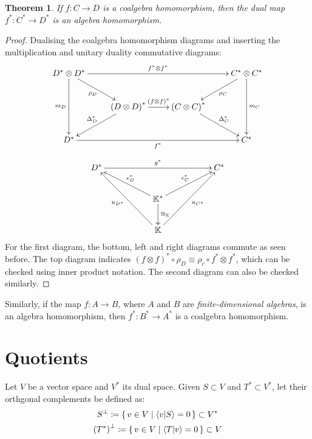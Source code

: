\documentclass[svgnames]{article}
\newtheorem{Theorem}{Theorem}
\theoremstyle{definition}
\theoremstyle{remark}
\theoremstyle{underline}
\theoremstyle{underline}
\begin{document}
	\begin{Theorem}
		If $f\colon C \to D$ is a coalgebra homomorphism, then the dual map $f^*\colon C^* \to D^*$ is an algebra homomorphism.
	\end{Theorem}
	\begin{proof}
		Dualising the coalgebra homomorphism diagrams and inserting the multiplication and unitary duality commutative diagrams:
		\begin{align*}
		\xymatrix{
			D^* \otimes D^* \ar[dd]_-{m_D} \ar[rd]_-{\rho_D} \ar[rrr]^-{f^* \otimes f^*} & & & C^* \otimes C^* \ar[ld]^-{\rho_C} \ar[dd]^-{m_C} \\
			& \pqty{D \otimes D}^* \ar[r]^-{\pqty{f \otimes f}^*} \ar[ld]_-{\Delta^*_D} & \pqty{C \otimes C}^* \ar[rd]^-{\Delta^*_C} & \\
			D^* \ar[rrr]_-{f^*} & & & C^*
		}
		\end{align*}
		\begin{align*}
			\xymatrix{
			D^* \ar[rrrr]^-{g^*} & & & & C^*  \\
			& & \mathbb K^* \ar[llu]_-{\epsilon^*_D} \ar[d]^-{\cong_{\mathbb K}} \ar[rru]^-{\epsilon^*_C} & & \\
			& & \mathbb K \ar[lluu]^-{u_{D^*}} \ar[rruu]_-{u_{C^*}} & & 
		}
		\end{align*}
		For the first diagram, the bottom, left and right diagrams commute as seen before. The top diagram indicates $(f \otimes f)^* \circ \rho_D \equiv \rho_c \circ f^* \otimes f^*$, which can be checked using inner product notation. The second diagram can also be checked similarly.
	\end{proof}
	Similarly, if the map $f\colon A \to B$, where $A$ and $B$ are \emph{finite-dimensional algebras}, is an algebra homomorphism, then $f^* \colon B^* \to A^*$ is a coalgebra homomorphism. 

	\section{Quotients}

	Let $V$ be a vector space and $V^*$ its dual space. Given $S \subset V$ and $T^* \subset V^* $, let their orthgonal complements be defined as:
	\begin{gather*}
		S^{\perp} \coloneqq \qty{\, v \in V \mid \braket{v}{S} = 0 \,} \subset V^* \\
		\pqty{T^*}^{\perp} \coloneqq \qty{\, v \in V \mid \braket{T}{v} = 0 \,} \subset V
	\end{gather*}
\end{document}
